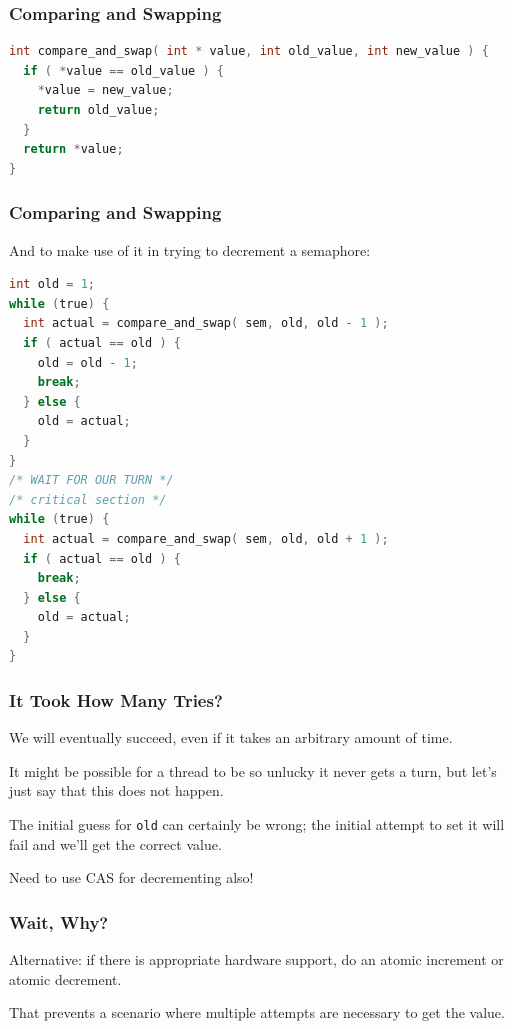 \begin{frame}[fragile]
\frametitle{Comparing and Swapping}

\begin{lstlisting}[language=C]
int compare_and_swap( int * value, int old_value, int new_value ) {
  if ( *value == old_value ) {
    *value = new_value;
    return old_value;
  }
  return *value;
}
\end{lstlisting}

\end{frame}

\begin{frame}[fragile]
\frametitle{Comparing and Swapping}

And to make use of it in trying to decrement a semaphore:

\begin{lstlisting}[language=C]
int old = 1;
while (true) {
  int actual = compare_and_swap( sem, old, old - 1 );
  if ( actual == old ) {
    old = old - 1;
    break;
  } else {
    old = actual;
  }
}
/* WAIT FOR OUR TURN */
/* critical section */
while (true) {
  int actual = compare_and_swap( sem, old, old + 1 );
  if ( actual == old ) {
    break;
  } else {
    old = actual;
  }
}
\end{lstlisting}

\end{frame}

\begin{frame}
\frametitle{It Took How Many Tries?}

We will eventually succeed, even if it takes an arbitrary amount of time.

 It might be possible for a thread to be so unlucky it never gets a turn, but let's just say that this does not happen.

The initial guess for \texttt{old} can certainly be wrong; the initial attempt to set it will fail and we'll get the correct value.

Need to use CAS for decrementing also!

\end{frame}

\begin{frame}
\frametitle{Wait, Why?}

Alternative: if there is appropriate hardware support, do an atomic increment or atomic decrement.

That prevents a scenario where multiple attempts are necessary to get the value. 

\end{frame}

